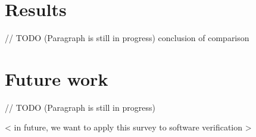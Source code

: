 \documentclass[article]{aaltoseries}
\begin{document}

\section{Results}
\label{sec:results}

// TODO (Paragraph is still in progress)
conclusion of comparison


\section{Future work}
\label{sec:future_work}

// TODO (Paragraph is still in progress)

< in future, we want to apply this survey to software verification >






\end{document}
